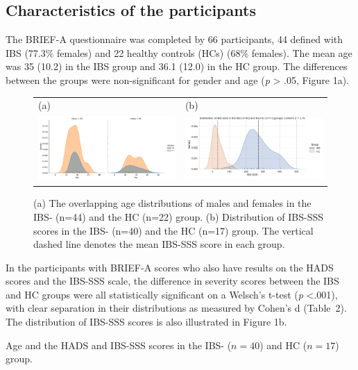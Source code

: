 \documentclass[jcm,article,submit,pdftex,moreauthors]{Definitions/mdpi}
\begin{document}
\subsection{Characteristics of the participants}
The BRIEF-A questionnaire was completed by 66 participants, 44 defined with IBS (77.3\% females) and 22 healthy controls (HCs) (68\% females). The mean age was 35 (10.2) in the IBS group and 36.1 (12.0) in the HC group. The differences between the groups were non-significant for gender and age (\emph{p} > .05, Figure 1a). 

\begin{figure}[H]
\begin{tabular}{ll}
(a) & (b) \\
\includegraphics[width=6.5cm]{Figs/Age_dist_IBS_and_HC_in_M_vs_F.pdf} &
\includegraphics[width=6.5cm]{Figs/IBS-SSS_dist_in_IBS_vs_HC.pdf}
\end{tabular}
\caption{(a) The overlapping age distributions of males and females in the  IBS- (n=44) and the HC (n=22) group. (b) Distribution of IBS-SSS scores in the IBS- (n=40) and the HC (n=17) group. The vertical dashed line denotes the mean IBS-SSS score in each group.}
\end{figure} 



In the participants with BRIEF-A scores who also have results on the HADS scores and the IBS-SSS scale, the difference in severity scores between the IBS and HC groups were all statistically significant on a Welsch's t-test (\emph{p} <.001), with clear separation in their distributions as measured by Cohen's d (Table~2). The distribution of IBS-SSS scores is also illustrated in Figure 1b. 



\begin{table}[H]
\begin{center}
 
\caption{Age and the HADS and IBS-SSS scores in the IBS- ($n=40$)  and HC ($n=17$) group.}
\end{center}
\end{table}
\end{document}
